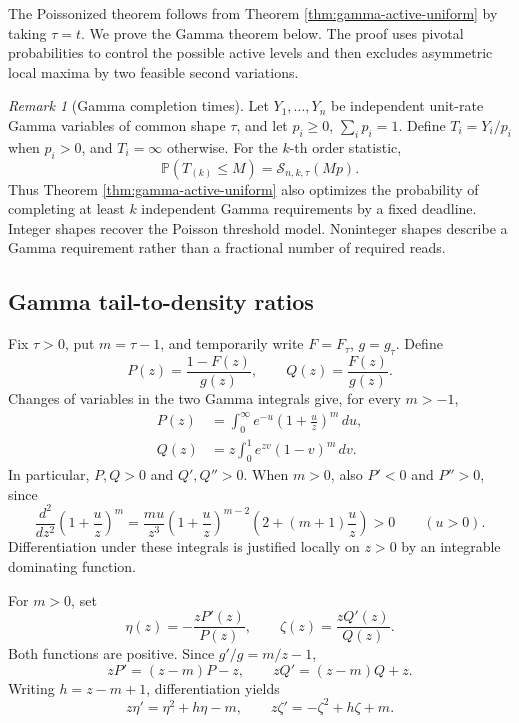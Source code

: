 \documentclass[11pt]{article}
\theoremstyle{definition}
\theoremstyle{remark}
\newtheorem{remark}{Remark}
\newcommand{\Pbb}{\mathbb P}
\newcommand{\1}{\mathbf 1}
\begin{document}
The Poissonized theorem follows from Theorem \ref{thm:gamma-active-uniform} by taking \(\tau=t\).  We prove the Gamma theorem below.  The proof uses pivotal probabilities to control the possible active levels and then excludes asymmetric local maxima by two feasible second variations.

\begin{remark}[Gamma completion times]
Let \(Y_1,\ldots,Y_n\) be independent unit-rate Gamma variables of common shape \(\tau\), and let \(p_i\ge0\), \(\sum_i p_i=1\).  Define \(T_i=Y_i/p_i\) when \(p_i>0\), and \(T_i=\infty\) otherwise.  For the \(k\)-th order statistic,
\[
  \Pbb(T_{(k)}\le M)=\mathcal S_{n,k,\tau}(Mp).
\]
Thus Theorem \ref{thm:gamma-active-uniform} also optimizes the probability of completing at least \(k\) independent Gamma requirements by a fixed deadline.  Integer shapes recover the Poisson threshold model.  Noninteger shapes describe a Gamma requirement rather than a fractional number of required reads.
\end{remark}

\subsection{Gamma tail-to-density ratios}

Fix \(\tau>0\), put \(m=\tau-1\), and temporarily write \(F=F_\tau\), \(g=g_\tau\).  Define
\[
  P(z)=\frac{1-F(z)}{g(z)},
  \qquad Q(z)=\frac{F(z)}{g(z)}.
\]
Changes of variables in the two Gamma integrals give, for every \(m>-1\),
\begin{align}
  P(z)&=\int_0^\infty e^{-u}
                  \left(1+\frac uz\right)^m\,du,
       \label{eq:mds-gamma-P-integral}\\
  Q(z)&=z\int_0^1 e^{zv}(1-v)^m\,dv.
       \label{eq:mds-gamma-Q-integral}
\end{align}
In particular, \(P,Q>0\) and \(Q',Q''>0\).  When \(m>0\), also \(P'<0\) and \(P''>0\), since
\[
  \frac{d^2}{dz^2}\left(1+\frac uz\right)^m
  =\frac{mu}{z^3}\left(1+\frac uz\right)^{m-2}
      \left(2+(m+1)\frac uz\right)>0
  \qquad(u>0).
\]
Differentiation under these integrals is justified locally on \(z>0\) by an integrable dominating function.

For \(m>0\), set
\[
  \eta(z)=-\frac{zP'(z)}{P(z)},
  \qquad
  \zeta(z)=\frac{zQ'(z)}{Q(z)}.
\]
Both functions are positive.  Since \(g'/g=m/z-1\),
\[
  zP'=(z-m)P-z,
  \qquad
  zQ'=(z-m)Q+z.
\]
Writing \(h=z-m+1\), differentiation yields
\begin{equation}
\label{eq:mds-gamma-riccati}
  z\eta'=\eta^2+h\eta-m,
  \qquad
  z\zeta'=-\zeta^2+h\zeta+m.
\end{equation}
\end{document}
